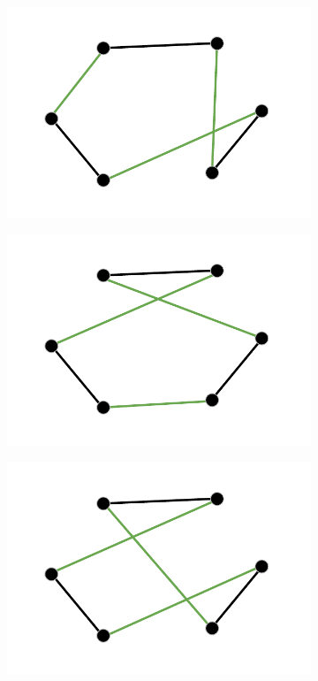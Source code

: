 \begin{figure}[h!]
\begin{subfigure}[b]{0.24\linewidth}
    \caption{}
  \end{subfigure}
  \begin{subfigure}[b]{0.24\linewidth}
    \includegraphics[width=\linewidth]{media/threeopt3.pdf}
    \caption{}
  \end{subfigure}
  \begin{subfigure}[b]{0.24\linewidth}
    \includegraphics[width=\linewidth]{media/threeopt4.pdf}
    \caption{}
  \end{subfigure}
  \begin{subfigure}[b]{0.24\linewidth}
    \includegraphics[width=\linewidth]{media/threeopt5.pdf}

\end{subfigure}
\end{figure}
